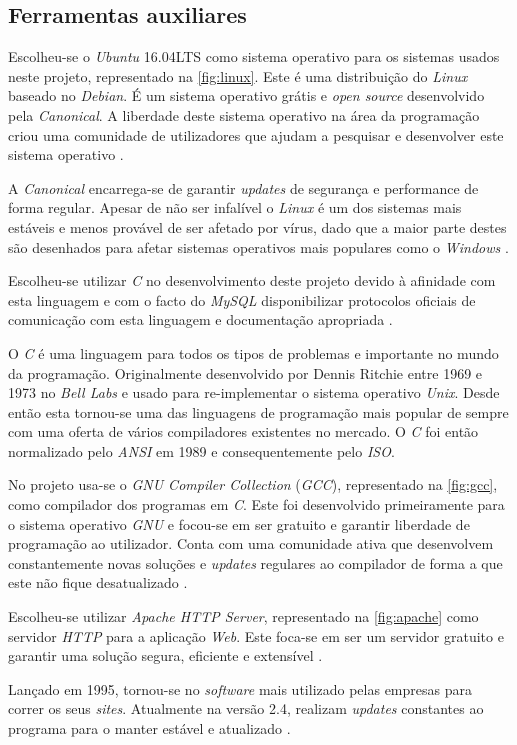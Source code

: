 \documentclass[11pt,twoside,a4paper]{report}
\begin{document}
\subsection{Ferramentas auxiliares}
Escolheu-se o \textit{Ubuntu} 16.04LTS como sistema operativo para os sistemas usados neste projeto, representado na \autoref{fig:linux}. Este é uma distribuição do \textit{Linux} baseado no \textit{Debian}. É um sistema operativo grátis e \textit{open source} desenvolvido pela \textit{Canonical}. A liberdade deste sistema operativo na área da programação criou uma comunidade de utilizadores que ajudam a pesquisar e desenvolver este sistema operativo \cite{ubuntu}.\par 
A \textit{Canonical} encarrega-se de garantir \textit{updates} de segurança e performance de forma regular. Apesar de não ser infalível o \textit{Linux} é um dos sistemas mais estáveis e menos provável de ser afetado por vírus, dado que a maior parte destes são desenhados para afetar sistemas operativos mais populares como o \textit{Windows} \cite{ubuntu}.\par
Escolheu-se utilizar \textit{C} no desenvolvimento deste projeto devido à afinidade com esta linguagem e com o facto do \textit{MySQL} disponibilizar protocolos oficiais de comunicação com esta linguagem e documentação apropriada \cite{mysql}.\par
O \textit{C} é uma linguagem para todos os tipos de problemas e importante no mundo da programação. Originalmente desenvolvido por Dennis Ritchie entre 1969 e 1973 no \textit{Bell Labs} e usado para re-implementar o sistema operativo \textit{Unix}. Desde então esta tornou-se uma das linguagens de programação mais popular de sempre com uma oferta de vários compiladores existentes no mercado. O \textit{C} foi então normalizado pelo \textit{ANSI} em 1989 e consequentemente pelo \textit{ISO}.\par 
No projeto usa-se o \textit{GNU Compiler Collection} (\textit{GCC}), representado na \autoref{fig:gcc}, como compilador dos programas em \textit{C}. Este foi desenvolvido primeiramente para o sistema operativo \textit{GNU} e focou-se em ser gratuito e garantir liberdade de programação ao utilizador. Conta com uma comunidade ativa que desenvolvem constantemente novas soluções e \textit{updates} regulares ao compilador de forma a que este não fique desatualizado \cite{gcc}.\par 
Escolheu-se utilizar \textit{Apache HTTP Server}, representado na \autoref{fig:apache} como servidor \textit{HTTP} para a aplicação \textit{Web}. Este foca-se em ser um servidor gratuito e garantir uma solução segura, eficiente e extensível \cite{apache}.\par
Lançado em 1995, tornou-se no \textit{software} mais utilizado pelas empresas para correr os seus \textit{sites}. Atualmente na versão 2.4, realizam \textit{updates} constantes ao programa para o manter estável e atualizado \cite{apache}.
\end{document}
